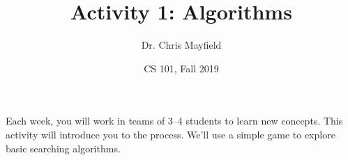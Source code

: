 \documentclass[12pt]{article}
\title{Activity 1: Algorithms}
\author{Dr. Chris Mayfield}
\date{CS 101, Fall 2019}
\begin{document}
\maketitle

Each week, you will work in teams of 3--4 students to learn new concepts.
This activity will introduce you to the process.
We'll use a simple game to explore basic searching algorithms.

%

\end{document}
